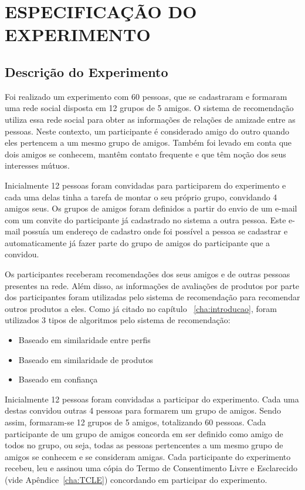 \chapter{ESPECIFICAÇÃO DO EXPERIMENTO} %
\label{cha:especificacao_do_experimento} %

\section{Descrição do Experimento}
\label{cha:descricao_do_experimento}

Foi realizado um experimento com 60 pessoas, que se cadastraram e formaram uma rede social disposta em 12 grupos de 5 amigos. O sistema de recomendação utiliza essa rede social para obter as informações de relações de amizade entre as pessoas. Neste contexto, um participante é considerado amigo do outro quando eles pertencem a um mesmo grupo de amigos. Também foi levado em conta que dois amigos se conhecem, mantêm contato frequente e que têm noção dos seus interesses mútuos.

Inicialmente 12 pessoas foram convidadas para participarem do experimento e cada uma delas tinha a tarefa de montar o seu próprio grupo, convidando 4 amigos seus. Os grupos de amigos foram definidos a partir do envio de um e-mail com um convite do participante já cadastrado no sistema a outra pessoa. Este e-mail possuía um endereço de cadastro onde foi possível a pessoa se cadastrar e automaticamente já fazer parte do grupo de amigos do participante que a convidou.

Os participantes receberam recomendações dos seus amigos e de outras pessoas presentes na rede. Além disso, as informações de avaliações de produtos por parte dos participantes foram utilizadas pelo sistema de recomendação para recomendar outros produtos a eles. Como já citado no capítulo ~\ref{cha:introducao}, foram utilizados 3 tipos de algoritmos pelo sistema de recomendação:

\begin{itemize}
  \item Baseado em similaridade entre perfis
  \item Baseado em similaridade de produtos
  \item Baseado em confiança
\end{itemize}

Inicialmente 12 pessoas foram convidadas a participar do experimento. Cada uma destas convidou outras 4 pessoas para formarem um grupo de amigos. Sendo assim, formaram-se 12 grupos de 5 amigos, totalizando 60 pessoas. Cada participante de um grupo de amigos concorda em ser definido como amigo de todos no grupo, ou seja, todas as pessoas pertencentes a um mesmo grupo de amigos se conhecem e se consideram amigas. Cada participante do experimento recebeu, leu e assinou uma cópia do Termo de Consentimento Livre e Esclarecido (vide Apêndice~\ref{cha:TCLE}) concordando em participar do experimento.

